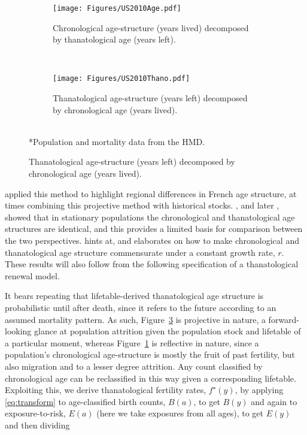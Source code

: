 \documentclass{article}
\begin{document}
\begin{figure}[ht!]
	\caption{2010 US population structure}
	\begin{center}
	\begin{subfigure}{.45\textwidth}
		\caption{Chronological age-structure (years lived) decomposed by
		thanatological age (years left).}
		\label{fig:USdecomp}
		\texttt{[image: Figures/US2010Age.pdf]}
	\end{subfigure}
	~
	\begin{subfigure}{.45\textwidth}
		\caption{Thanatological age-structure (years left) decomposed by chronological
		age (years lived).}
		\label{fig:USrecomp}
		\texttt{[image: Figures/US2010Thano.pdf]}
	\end{subfigure}
	\\
	\small{*Population and mortality data from the HMD.}
	\end{center}
\end{figure}

\citet{brouard1986structure} applied this method to highlight regional
differences in French age structure, at times combining this projective method
with historical stocks. \citet{brouard1989mouvements}, and later
\citet{vaupel2009life}, showed that in stationary populations the chronological
and thanatological age structures are identical, and this provides a
limited basis for comparison between the two perspectives. \citet{wachter2014essential} hints at, and
\citet{vaupel2014stable} elaborates on how to make chronological and
thanatological age structure commensurate under a constant growth rate, $r$.
These results will also follow from the following specification of a
thanatological renewal model.

It bears repeating that lifetable-derived thanatological age structure is probabilistic until after death, since it refers to the future according to an assumed mortality pattern.
As such, Figure~\ref{fig:USrecomp} is projective in nature, a forward-looking
glance at population attrition given the population stock and lifetable of a
particular moment, whereas Figure~\ref{fig:USdecomp} is reflective in nature,
since a population's chronological age-structure is mostly the fruit of past
fertility, but also migration and to a lesser degree attrition. Any count
classified by chronological age can be reclassified in this way given a
corresponding lifetable. Exploiting this, we derive thanatological fertility
rates, $f^\star(y)$, by applying \eqref{eq:transform} to age-classified birth
counts, $B(a)$, to get $B(y)$ and again to exposure-to-risk, $E(a)$ (here we
take exposures from all ages), to get $E(y)$ and then dividing
\end{document}
